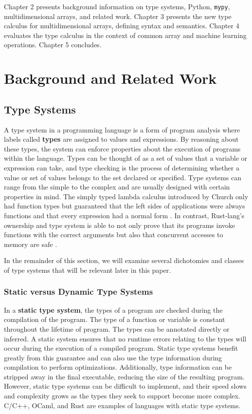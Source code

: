 \documentclass{report}
\begin{document}
Chapter 2 presents background information on type systems, Python, \texttt{mypy}, multidimensional arrays, and related work. Chapter 3 presents the new type calculus for multidimensional arrays, defining syntax and semantics. Chapter 4 evaluates the type calculus in the context of common array and machine learning operations. Chapter 5 concludes.

\chapter{Background and Related Work}

\section{Type Systems}

A type system in a programming language is a form of program analysis where labels called \textbf{types} are assigned to values and expressions. By reasoning about these types, the system can enforce properties about the execution of programs within the language. Types can be thought of as a set of values that a variable or expression can take, and type checking is the process of determining whether a value or set of values belongs to the set declared or specified. Type systems can range from the simple to the complex and are usually designed with certain properties in mind. The simply typed lambda calculus introduced by Church only had function types but guaranteed that the left sides of applications were always functions and that every expression had a normal form \cite{Church1940AFO}. In contrast, Rust-lang's ownership and type system is able to not only prove that its programs invoke functions with the correct arguments but also that concurrent accesses to memory are safe \cite{rustlang}.

In the remainder of this section, we will examine several dichotomies and classes of type systems that will be relevant later in this paper.

\subsection{Static versus Dynamic Type Systems}

In a \textbf{static type system}, the types of a program are checked during the compilation of the program. The type of a function or variable is constant throughout the lifetime of program. The types can be annotated directly or inferred. A static system ensures that no runtime errors relating to the types will occur during the execution of a compiled program. Static type systems benefit greatly from this guarantee and can also use the type information during compilation to perform optimizations. Additionally, type information can be stripped away in the final executable, reducing the size of the resulting program. However, static type systems can be difficult to implement, and their speed slows and complexity grows as the types they seek to support become more complex. C/C++, OCaml, and Rust are examples of languages with static type systems.
\end{document}
